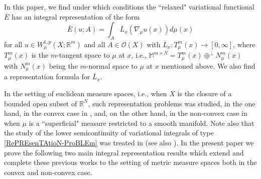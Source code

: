 \documentclass[10pt]{amsart}
\numberwithin{equation}{section}
\theoremstyle{definition}
\theoremstyle{remark}
\begin{document}
In this paper, we find under which conditions the ``relaxed" variational functional $\overline{E}$ has an integral representation of the form
\begin{equation}\label{RePREsenTAtioN-ProBLEm}
\overline{E}(u;A)=\int_A \overline{L}_x(\nabla_\mu u(x))d\mu(x)
\end{equation}
for all $u\in W^{1,p}_\mu(X;{{\mathbb R}}^m)$ and all $A\in\mathcal{O}(X)$ with $\overline{L}_x:T^m_\mu(x)\to[0,\infty]$, where $T^m_\mu(x)$ is the $m$-tangent space to $\mu$ at $x$, i.e., ${{\mathbb M}^{m\times N}}=T_\mu^m(x)\oplus^\perp N_\mu^m(x)$ with $N_\mu^m(x)$ being the $m$-normal space to $\mu$ at $x$ mentioned above.  We also find a representation formula for $\overline{L}_x$. 

In the setting of euclidean measure spaces, i.e., when $X$ is the closure of a bounded open subset of ${{\mathbb R}}^N$, such representation problems was studied, in the one hand, in the convex case in \cite{boubusep97,oah-jpm03,chiadopiat-zhikov03,oah-jpm04}, and, on the other hand, in the non-convex case in \cite{jpm00,jpm05} when $\mu$ is a ``superficial" measure restricted to a smooth manifold. Note also that the study of the lower semicontinuity of variational integrals of type \eqref{RePREsenTAtioN-ProBLEm} was treated in \cite{fragala03} (see also \cite{mocanu05}). In the present paper we prove the following two main integral representation results which extend and complete these previous works to the setting of metric measure spaces both in the convex and non-convex case. 
\end{document}
